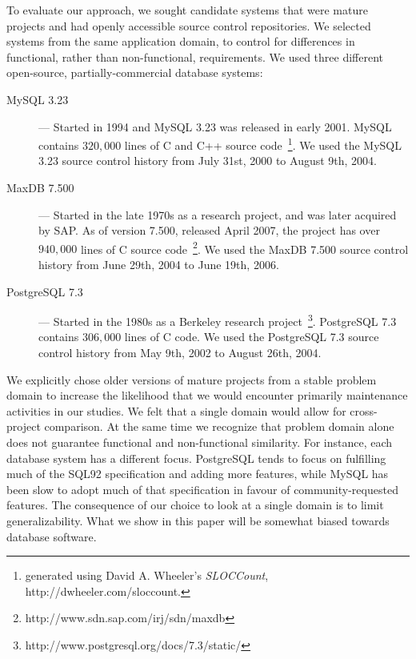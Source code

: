\documentclass[smallextended]{svjour3}       %
\begin{document}
To evaluate our approach, we sought candidate systems that were mature projects and had openly accessible source control repositories. 
We selected systems from the same application domain, to control for differences in functional, rather than non-functional, requirements. 
We used three different open-source, partially-commercial database systems:
\begin{description}
\item [ MySQL 3.23] --- Started in 1994 and MySQL 3.23 was released in early 2001. MySQL contains $320,000$ lines of C and C++ source code~\footnote{generated
using David A. Wheeler's \emph{SLOCCount},
{http://dwheeler.com/sloccount}.}. We used the MySQL 3.23 source control  history from July
31st, 2000 to August 9th, 2004.
\item [MaxDB 7.500] --- Started in the late 1970s as a research project, and was later acquired by SAP. As of version 7.500, released April 2007, the project
has over $940,000$ lines of C source
code~\footnote{{http://www.sdn.sap.com/irj/sdn/maxdb}}. 
 We used the MaxDB 7.500 source control history from June
29th, 2004 to June 19th, 2006.
\item [PostgreSQL 7.3] --- Started in the 1980s as a Berkeley research
  project~\footnote{{http://www.postgresql.org/docs/7.3/static/}}. PostgreSQL
  7.3 contains $306,000$ lines of C code.
 We used the PostgreSQL 7.3 source control  history from May 9th, 2002 to 
 August 26th, 2004.

\end{description}
  
We explicitly chose older versions of mature projects from a stable problem domain to increase the likelihood that we would encounter primarily
maintenance activities in our studies. We felt that a single domain
would allow for cross-project comparison. At the same time we
recognize that problem domain alone does not guarantee functional and
non-functional similarity.
For instance, each database system has a different focus. PostgreSQL
tends to focus on fulfilling much of the SQL92 specification and adding
more features, while MySQL has been slow to adopt much of that specification in favour of community-requested features.
The consequence of our choice to look at a
single domain is to limit generalizability. What we show in this paper
will be somewhat biased towards database software.
\end{document}
